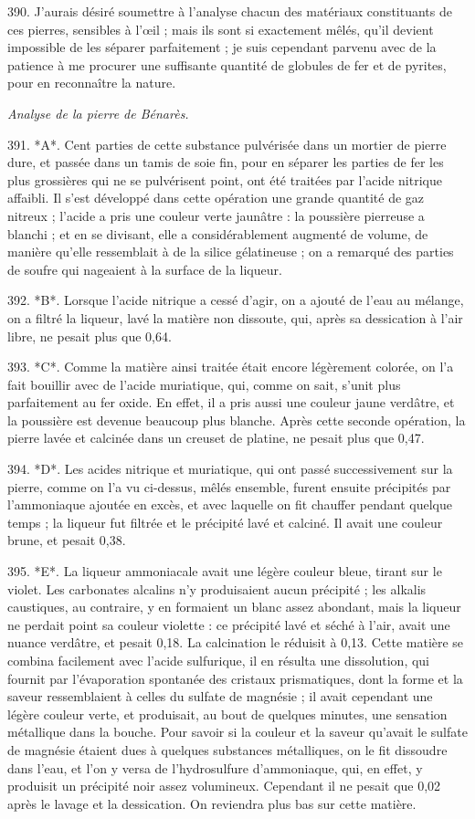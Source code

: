 \documentclass[a4paper, 11pt, oneside, polutonikogreek, french]{article}
\begin{document}
390. J'aurais désiré soumettre à l'analyse chacun des matériaux constituants de ces pierres, sensibles à l'œil ; mais ils sont si exactement mêlés, qu'il devient impossible de les séparer parfaitement ; je suis cependant parvenu avec de la patience à me procurer une suffisante quantité de globules de fer et de pyrites, pour en reconnaître la nature.

\emph{Analyse de la pierre de Bénarès.}

391. *A*. Cent parties de cette substance pulvérisée dans un mortier de pierre dure, et passée dans un tamis de soie fin, pour en séparer les parties de fer les plus grossières qui ne se pulvérisent point, ont été traitées par l'acide nitrique affaibli. Il s'est développé dans cette opération une grande quantité de gaz nitreux ; l'acide a pris une couleur verte jaunâtre : la poussière pierreuse a blanchi ; et en se divisant, elle a considérablement augmenté de volume, de manière qu'elle ressemblait à de la silice gélatineuse ; on a remarqué des parties de soufre qui nageaient à la surface de la liqueur.

392. *B*. Lorsque l'acide nitrique a cessé d'agir, on a ajouté de l'eau au mélange, on a filtré la liqueur, lavé la matière non dissoute, qui, après sa dessication à l'air libre, ne pesait plus que 0,64.

393. *C*. Comme la matière ainsi traitée était encore légèrement colorée, on l'a fait bouillir avec de l'acide muriatique, qui, comme on sait, s'unit plus parfaitement au fer oxide. En effet, il a pris aussi une couleur jaune verdâtre, et la poussière est devenue beaucoup plus blanche. Après cette seconde opération, la pierre lavée et calcinée dans un creuset de platine, ne pesait plus que 0,47.

394. *D*. Les acides nitrique et muriatique, qui ont passé successivement sur la pierre, comme on l'a vu ci-dessus, mêlés ensemble, furent ensuite précipités par l'ammoniaque ajoutée en excès, et avec laquelle on fit chauffer pendant quelque temps ; la liqueur fut filtrée et le précipité lavé et calciné. Il avait une couleur brune, et pesait 0,38.

395. *E*. La liqueur ammoniacale avait une légère couleur bleue, tirant sur le violet. Les carbonates alcalins n'y produisaient aucun précipité ; les alkalis caustiques, au contraire, y en formaient un blanc assez abondant, mais la liqueur ne perdait point sa couleur violette : ce précipité lavé et séché à l'air, avait une nuance verdâtre, et pesait 0,18. La calcination le réduisit à 0,13. Cette matière se combina facilement avec l'acide sulfurique, il en résulta une dissolution, qui fournit par l'évaporation spontanée des cristaux prismatiques, dont la forme et la saveur ressemblaient à celles du sulfate de magnésie ; il avait cependant une légère couleur verte, et produisait, au bout de quelques minutes, une sensation métallique dans la bouche. Pour savoir si la couleur et la saveur qu'avait le sulfate de magnésie étaient dues à quelques substances métalliques, on le fit dissoudre dans l'eau, et l'on y versa de l'hydrosulfure d'ammoniaque, qui, en effet, y produisit un précipité noir assez volumineux. Cependant il ne pesait que 0,02 après le lavage et la dessication. On reviendra plus bas sur cette matière.
\end{document}
